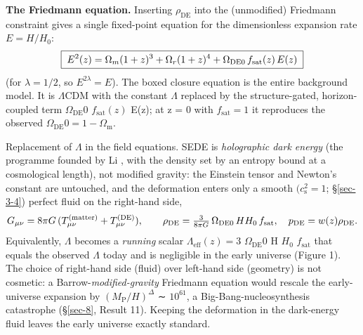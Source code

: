 \documentclass[preprint,12pt]{elsarticle}
\begin{document}
\textbf{The Friedmann equation.} Inserting \(\rho _\mathrm{DE}\) into
the (unmodified) Friedmann constraint gives a single fixed-point
equation for the dimensionless expansion rate \(E = H/H_{0}\):
\begin{equation}\boxed{\;E^2(z) = \Omega_m(1+z)^3 + \Omega_r(1+z)^4 + \Omega_{\rm DE0}\, f_{\rm sat}(z)\, E(z)\;}\end{equation}
(for \(\lambda  = 1/2\), so \(E^{2\lambda } = E\)). The boxed closure
equation is the entire background model. It is \(\Lambda \mathrm{CDM}\)
with the constant \(\Lambda\) replaced by the structure-gated,
horizon-coupled term \(\Omega _\mathrm{DE}0\) \(f_{\mathrm{sat}}(z)\)
E(z); at z = 0 with \(f_{\mathrm{sat}} = 1\) it reproduces the observed
\(\Omega _\mathrm{DE}0 = 1 - \Omega _{\mathrm{m}}\).

Replacement of \(\Lambda\) in the field equations. SEDE is
\emph{holographic dark energy} (the programme founded by Li
\citep{Li:2004rb}, with the density set by an entropy bound at a
cosmological length), not modified gravity: the Einstein tensor and
Newton's constant are untouched, and the deformation enters only a
smooth \((c_{\mathrm{s}}^{2} = 1\); §\ref{sec-3-4}) perfect fluid on the
right-hand side,
\begin{equation}G_{\mu\nu} = 8\pi G\,(T^{\rm (matter)}_{\mu\nu} + T^{\rm (DE)}_{\mu\nu}),\qquad
\rho_{\rm DE} = \tfrac{3}{8\pi G}\,\Omega_{\rm DE0}\, H H_0\, f_{\rm sat},\quad p_{\rm DE} = w(z)\rho_{\rm DE}.\end{equation}
Equivalently, \(\Lambda\) becomes a \emph{running} scalar
\(\Lambda _{\mathrm{eff}}(z) = 3\) \(\Omega _\mathrm{DE}0\) H \(H_{0}\)
\(f_{\mathrm{sat}}\) that equals the observed \(\Lambda\) today and is
negligible in the early universe (Figure 1). The choice of right-hand
side (fluid) over left-hand side (geometry) is not cosmetic: a
Barrow-\emph{modified-gravity} Friedmann equation would rescale the
early-universe expansion by \((M_{\mathrm{P}}/H)^{\Delta }\) ∼
\(10^{61}\), a Big-Bang-nucleosynthesis catastrophe (§\ref{sec-8},
Result 11). Keeping the deformation in the dark-energy fluid leaves the
early universe exactly standard.
\end{document}
